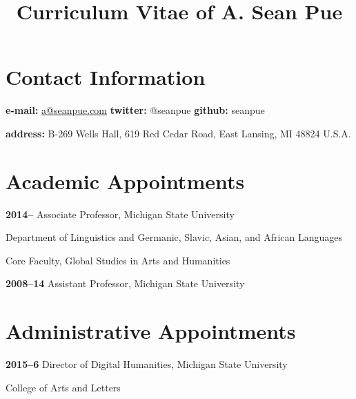 \documentclass[letterpaper,12pt]{article}
\title{\phantomsection%
  Curriculum Vitae of A. Sean Pue%
  \label{curriculum-vitae-of-a-sean-pue}}
\author{}
\date{}
\newenvironment{DUlineblock}[1]{%
    \list{}{\setlength{\partopsep}{\parskip}
            \addtolength{\partopsep}{\baselineskip}
            \setlength{\topsep}{0pt}
            \setlength{\itemsep}{0.15\baselineskip}
            \setlength{\parsep}{0pt}
            \setlength{\leftmargin}{#1}}
    \raggedright
  }
  {\endlist}
\begin{document}
\maketitle


\section{Contact Information%
  \label{contact-information}%
}

\begin{DUlineblock}{0em}
\item[] \textbf{e-mail:}
\href{mailto:a@seanpue.com}{a@seanpue.com}
\textbf{twitter:}
@seanpue
\textbf{github:}
seanpue
\item[] \textbf{address:}
B-269 Wells Hall, 619 Red Cedar Road, East Lansing, MI 48824 U.S.A.
\end{DUlineblock}


\section{Academic Appointments%
  \label{academic-appointments}%
}

\begin{DUlineblock}{0em}
\item[] \textbf{2014–}
Associate Professor, Michigan State University
\item[]
\begin{DUlineblock}{\DUlineblockindent}
\item[] Department of Linguistics and Germanic, Slavic, Asian, and African Languages
\item[] Core Faculty, Global Studies in Arts and Humanities
\end{DUlineblock}
\item[] \textbf{2008–14}
Assistant Professor, Michigan State University
\end{DUlineblock}


\section{Administrative Appointments%
  \label{administrative-appointments}%
}

\begin{DUlineblock}{0em}
\item[] \textbf{2015–6}
Director of Digital Humanities, Michigan State University
\item[]
\begin{DUlineblock}{\DUlineblockindent}
\item[] College of Arts and Letters
\end{DUlineblock}
\end{DUlineblock}
\end{document}
